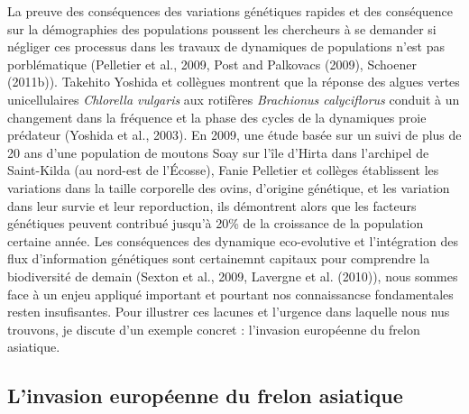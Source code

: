La preuve des conséquences des variations génétiques rapides et des
conséquence sur la démographies des populations poussent les chercheurs
à se demander si négliger ces processus dans les travaux de dynamiques
de populations n'est pas porblématique (Pelletier et al., 2009, Post and
Palkovacs (2009), Schoener (2011b)). Takehito Yoshida et collègues
montrent que la réponse des algues vertes unicellulaires \emph{Chlorella
vulgaris} aux rotifères \emph{Brachionus calyciflorus} conduit à un
changement dans la fréquence et la phase des cycles de la dynamiques
proie prédateur (Yoshida et al., 2003). En 2009, une étude basée sur un
suivi de plus de 20 ans d'une population de moutons Soay sur l'île
d'Hirta dans l'archipel de Saint-Kilda (au nord-est de l'Écosse), Fanie
Pelletier et collèges établissent les variations dans la taille
corporelle des ovins, d'origine génétique, et les variation dans leur
survie et leur reporduction, ils démontrent alors que les facteurs
génétiques peuvent contribué jusqu'à 20\% de la croissance de la
population certaine année. Les conséquences des dynamique eco-evolutive
et l'intégration des flux d'information génétiques sont certainemnt
capitaux pour comprendre la biodiversité de demain (Sexton et al., 2009,
Lavergne et al. (2010)), nous sommes face à un enjeu appliqué important
et pourtant nos connaissancse fondamentales resten insufisantes. Pour
illustrer ces lacunes et l'urgence dans laquelle nous nus trouvons, je
discute d'un exemple concret : l'invasion européenne du frelon
asiatique.

\subsection*{L'invasion européenne du frelon
asiatique}\label{linvasion-europuxe9enne-du-frelon-asiatique}


